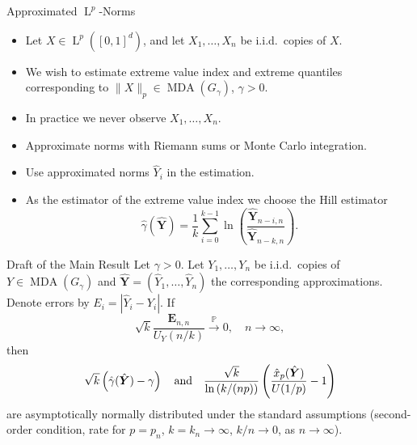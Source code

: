 \documentclass[11pt, aspectratio=169]{beamer}
\DeclareMathOperator{\mda}{MDA}
\DeclareMathOperator{\lp}{L}
\begin{document}
\begin{frame}{Approximated $\lp^p$-Norms}
  \begin{itemize}
    \item Let $X\in \lp^p\left([0, 1]^d\right)$, and let $X_1,\ldots, X_n$ be
    i.i.d.\ copies of $X$.
    \item We wish to estimate extreme value index and extreme quantiles
    corresponding to $\|X\|_p\in\mda\left(G_\gamma\right)$, $\gamma > 0$.
    \pause
    \item In practice we never observe $X_1, \ldots, X_n$.
    \pause
    \item Approximate norms with Riemann sums or Monte Carlo integration.
    \item Use approximated norms $\hat{Y}_i$ in the estimation.
    \pause
    \item As the estimator of the extreme value index we choose the Hill
    estimator
    \begin{equation*}
      \hat\gamma(\hat{\bm Y}) = \frac{1}{k}\sum_{i = 0}^{k-1}
      \ln\left(\frac{\hat{\bm Y}_{n-i,n}}{\hat{\bm Y}_{n-k,n}}\right).
    \end{equation*}
  \end{itemize}
\end{frame}


\begin{frame}{Draft of the Main Result}
  Let $\gamma > 0$. Let $Y_1, \ldots, Y_n$ be i.i.d.\ copies of
  $Y\in\mda\left(G_\gamma\right)$ and $\hat{\bm Y} = (\hat Y_1, \ldots, \hat
  Y_n)$ the corresponding approximations. Denote errors by $E_i = \left|\hat Y_i
  - Y_i\right|$. If
  \begin{equation*}
    \sqrt{k}\frac{\bm E_{n,n}}{U_Y\left(n/k\right)}\stackrel{\mathbb{P}}{\to}0,
    \quad n\to\infty,
  \end{equation*}
  then
  \begin{equation*}
    \sqrt{k}\left(\hat\gamma(\hat{\bm Y}) - \gamma\right)
    \quad\textnormal{and}\quad
    \frac{\sqrt{k}}{\ln\left(k/(np)\right)}\left(\frac{\hat x_p(\hat{\bm Y})}
    {U(1/p)} - 1\right)
  \end{equation*}
  are asymptotically normally distributed under the standard assumptions
  (second-order condition, rate for $p = p_n$, $k = k_n\to\infty$, $k/n\to 0$,
  as $n\to\infty$). 
\end{frame}

\end{document}
